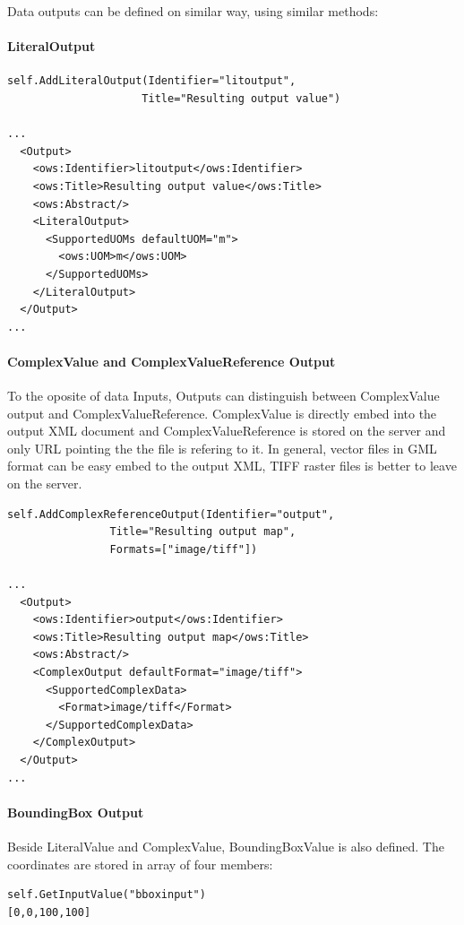 \documentclass[a4paper,11pt]{article}
\begin{document}
Data outputs can be defined on similar way, using similar methods:

\paragraph{LiteralOutput}
\begin{verbatim}
self.AddLiteralOutput(Identifier="litoutput",
                     Title="Resulting output value")

...
  <Output>
    <ows:Identifier>litoutput</ows:Identifier>
    <ows:Title>Resulting output value</ows:Title>
    <ows:Abstract/>
    <LiteralOutput>
      <SupportedUOMs defaultUOM="m">
        <ows:UOM>m</ows:UOM>
      </SupportedUOMs>
    </LiteralOutput>
  </Output>
...
\end{verbatim}

\paragraph{ComplexValue and ComplexValueReference Output}
To the oposite of data Inputs, Outputs can distinguish between ComplexValue
output and ComplexValueReference. ComplexValue is directly embed into the
output XML document and ComplexValueReference is stored on the server and
only URL pointing the the file is refering to it. In general, vector files
in GML format can be easy embed to the output XML, TIFF raster files is
better to leave on the server.

\begin{verbatim}
self.AddComplexReferenceOutput(Identifier="output",
                Title="Resulting output map",
                Formats=["image/tiff"])

...
  <Output>
    <ows:Identifier>output</ows:Identifier>
    <ows:Title>Resulting output map</ows:Title>
    <ows:Abstract/>
    <ComplexOutput defaultFormat="image/tiff">
      <SupportedComplexData>
        <Format>image/tiff</Format>
      </SupportedComplexData>
    </ComplexOutput>
  </Output>
...
\end{verbatim}

\paragraph{BoundingBox Output}
Beside LiteralValue and ComplexValue, BoundingBoxValue is also defined. 
The coordinates are stored in array of four members:

\begin{verbatim}
self.GetInputValue("bboxinput")
[0,0,100,100]
\end{verbatim}
\end{document}
